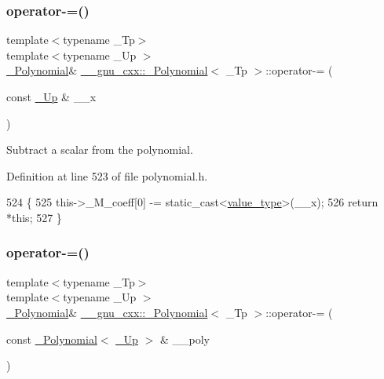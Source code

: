\subsubsection{\texorpdfstring{operator-\/=()}{operator-=()}\hspace{0.1cm}{\footnotesize\ttfamily [1/2]}}
{\footnotesize\ttfamily template$<$typename \+\_\+\+Tp$>$ \\
template$<$typename \+\_\+\+Up $>$ \\
\hyperlink{class____gnu__cxx_1_1__Polynomial}{\+\_\+\+Polynomial}\& \hyperlink{class____gnu__cxx_1_1__Polynomial}{\+\_\+\+\_\+gnu\+\_\+cxx\+::\+\_\+\+Polynomial}$<$ \+\_\+\+Tp $>$\+::operator-\/= (\begin{DoxyParamCaption}\item[{const \hyperlink{class____gnu__cxx_1_1__Polynomial_a242114d4b86648a5dff67a8221f80d40}{\+\_\+\+Up} \&}]{\+\_\+\+\_\+x }\end{DoxyParamCaption})\hspace{0.3cm}{\ttfamily [inline]}}

Subtract a scalar from the polynomial. 

Definition at line 523 of file polynomial.\+h.


\begin{DoxyCode}
524         \{
525           this->\_M\_coeff[0] -= \textcolor{keyword}{static\_cast<}\hyperlink{class____gnu__cxx_1_1__Polynomial_a725563351f50e76084a7a016c06f8a53}{value\_type}\textcolor{keyword}{>}(\_\_x);
526           \textcolor{keywordflow}{return} *\textcolor{keyword}{this};
527         \}
\end{DoxyCode}
\mbox{\label{class____gnu__cxx_1_1__Polynomial_af092dce5f209610ec20ea84ccfe0a5f1}} 
\subsubsection{\texorpdfstring{operator-\/=()}{operator-=()}\hspace{0.1cm}{\footnotesize\ttfamily [2/2]}}
{\footnotesize\ttfamily template$<$typename \+\_\+\+Tp$>$ \\
template$<$typename \+\_\+\+Up $>$ \\
\hyperlink{class____gnu__cxx_1_1__Polynomial}{\+\_\+\+Polynomial}\& \hyperlink{class____gnu__cxx_1_1__Polynomial}{\+\_\+\+\_\+gnu\+\_\+cxx\+::\+\_\+\+Polynomial}$<$ \+\_\+\+Tp $>$\+::operator-\/= (\begin{DoxyParamCaption}\item[{const \hyperlink{class____gnu__cxx_1_1__Polynomial}{\+\_\+\+Polynomial}$<$ \hyperlink{class____gnu__cxx_1_1__Polynomial_a242114d4b86648a5dff67a8221f80d40}{\+\_\+\+Up} $>$ \&}]{\+\_\+\+\_\+poly }\end{DoxyParamCaption})\hspace{0.3cm}{\ttfamily [inline]}}

